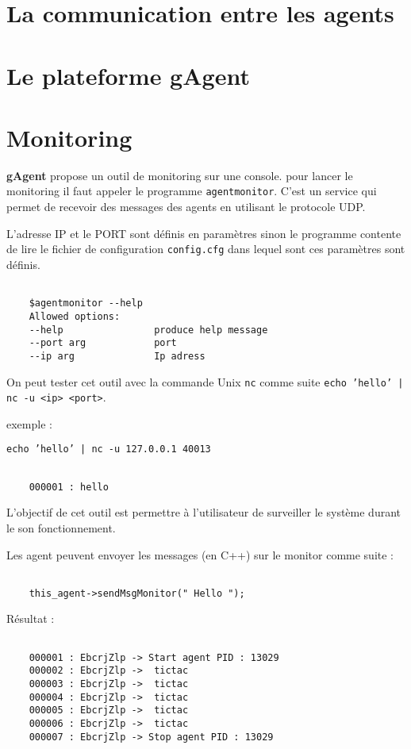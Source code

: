 \section{La communication entre les agents}



\section{Le plateforme gAgent}



\section{Monitoring}

\textbf{gAgent} propose un outil de monitoring sur une console. pour lancer le monitoring il faut appeler le programme \texttt{agentmonitor}. 
C'est un service qui permet de recevoir des messages des agents en utilisant le protocole UDP.

L'adresse IP et le PORT sont définis en paramètres sinon le programme contente de lire le fichier de configuration \texttt{config.cfg} dans lequel sont ces paramètres sont définis.

\begin{lstlisting}[backgroundcolor=\color{green!5}]

	$agentmonitor --help
	Allowed options:
	--help                produce help message
	--port arg            port
	--ip arg              Ip adress

\end{lstlisting}


On peut tester cet outil avec la commande Unix \texttt{nc} comme suite \texttt{echo 'hello' | nc -u <ip> <port>}.

exemple : 

\texttt{echo 'hello' | nc -u 127.0.0.1 40013}


\begin{lstlisting}[backgroundcolor=\color{green!5}]
	
	000001 : hello

\end{lstlisting}

L'objectif de cet outil est permettre à l'utilisateur de surveiller le système durant le son fonctionnement.

Les agent peuvent envoyer les messages (en C++) sur le monitor comme suite : 


\begin{lstlisting}

	this_agent->sendMsgMonitor(" Hello ");

\end{lstlisting}

Résultat :

\begin{lstlisting}[backgroundcolor=\color{green!5}]

	000001 : EbcrjZlp -> Start agent PID : 13029 
	000002 : EbcrjZlp ->  tictac  
	000003 : EbcrjZlp ->  tictac  
	000004 : EbcrjZlp ->  tictac  
	000005 : EbcrjZlp ->  tictac  
	000006 : EbcrjZlp ->  tictac  
	000007 : EbcrjZlp -> Stop agent PID : 13029 
  
\end{lstlisting}
